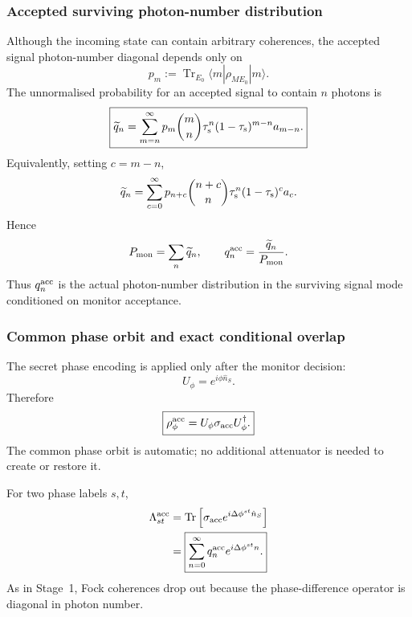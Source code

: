 \documentclass[11pt]{article}
\theoremstyle{remark}
\begin{document}
\subsubsection{Accepted surviving photon-number distribution}

Although the incoming state can contain arbitrary coherences, the accepted
signal photon-number diagonal depends only on
\begin{equation}
    p_m
    :=
    \operatorname{Tr}_{E_0}
    \langle m|\rho_{ME_0}|m\rangle.
    \label{eq:stage5a-input-diagonal}
\end{equation}
The unnormalised probability for an accepted signal to contain \(n\) photons is
\begin{equation}
    \boxed{
    \widetilde q_n
    =
    \sum_{m=n}^{\infty}
      p_m
      \binom mn
      \tau_{\rm s}^{n}
      (1-\tau_{\rm s})^{m-n}
      a_{m-n}.
    }
    \label{eq:stage5a-qtilde}
\end{equation}
Equivalently, setting \(c=m-n\),
\begin{equation}
    \widetilde q_n
    =
    \sum_{c=0}^{\infty}
      p_{n+c}
      \binom{n+c}{n}
      \tau_{\rm s}^{n}
      (1-\tau_{\rm s})^{c}
      a_c.
    \label{eq:stage5a-qtilde-c}
\end{equation}
Hence
\begin{equation}
    P_{\rm mon}
    =
    \sum_n\widetilde q_n,
    \qquad
    q_n^{\rm acc}
    =
    \frac{\widetilde q_n}{P_{\rm mon}}.
    \label{eq:stage5a-qacc}
\end{equation}
Thus \(q_n^{\rm acc}\) is the actual photon-number distribution in the
surviving signal mode conditioned on monitor acceptance.

\subsubsection{Common phase orbit and exact conditional overlap}

The secret phase encoding is applied only after the monitor decision:
\[
    U_\phi=e^{i\phi\hat n_S}.
\]
Therefore
\begin{equation}
    \boxed{
    \rho_\phi^{\rm acc}
    =
    U_\phi\sigma_{\rm acc}U_\phi^\dagger.
    }
    \label{eq:stage5a-common-orbit}
\end{equation}
The common phase orbit is automatic; no additional attenuator is needed to
create or restore it.

For two phase labels \(s,t\),
\begin{align}
    \Lambda_{st}^{\rm acc}
    &=
    \operatorname{Tr}
    \left[
      \sigma_{\rm acc}
      e^{i\Delta\phi^{st}\hat n_S}
    \right]
    \nonumber\\
    &=
    \boxed{
    \sum_{n=0}^{\infty}
      q_n^{\rm acc}
      e^{i\Delta\phi^{st}n}.
    }
    \label{eq:stage5a-overlap-q}
\end{align}
As in Stage~1, Fock coherences drop out because the phase-difference operator
is diagonal in photon number.
\end{document}
